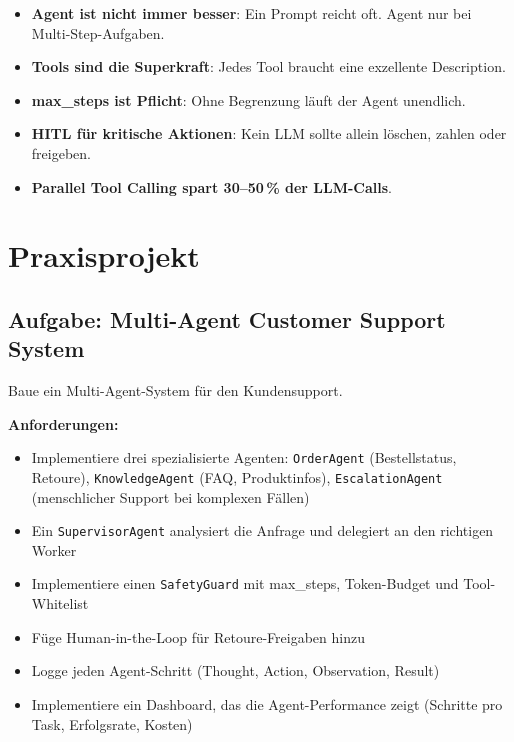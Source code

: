 \begin{merke}
\begin{itemize}
    \item \textbf{Agent ist nicht immer besser}: Ein Prompt reicht oft. Agent nur bei Multi-Step-Aufgaben.
    \item \textbf{Tools sind die Superkraft}: Jedes Tool braucht eine exzellente Description.
    \item \textbf{max\_steps ist Pflicht}: Ohne Begrenzung läuft der Agent unendlich.
    \item \textbf{HITL für kritische Aktionen}: Kein LLM sollte allein löschen, zahlen oder freigeben.
    \item \textbf{Parallel Tool Calling spart 30--50\,\% der LLM-Calls}.
\end{itemize}
\end{merke}

\section{Praxisprojekt}

\subsection{Aufgabe: Multi-Agent Customer Support System}

Baue ein Multi-Agent-System für den Kundensupport.

\textbf{Anforderungen:}
\begin{itemize}[leftmargin=*]
    \item Implementiere drei spezialisierte Agenten: \texttt{OrderAgent} (Bestellstatus, Retoure), \texttt{KnowledgeAgent} (FAQ, Produktinfos), \texttt{EscalationAgent} (menschlicher Support bei komplexen Fällen)
    \item Ein \texttt{SupervisorAgent} analysiert die Anfrage und delegiert an den richtigen Worker
    \item Implementiere einen \texttt{SafetyGuard} mit max\_steps, Token-Budget und Tool-Whitelist
    \item Füge Human-in-the-Loop für Retoure-Freigaben hinzu
    \item Logge jeden Agent-Schritt (Thought, Action, Observation, Result)
    \item Implementiere ein Dashboard, das die Agent-Performance zeigt (Schritte pro Task, Erfolgsrate, Kosten)
\end{itemize}

